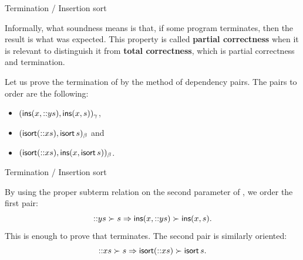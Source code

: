%
\begin{frame}{Termination / Insertion sort}

  Informally, what soundness means is that, if some program
  terminates, then the result is what was expected. This property is
  called \textbf{partial correctness} when it is relevant to
  distinguish it from \textbf{total correctness}, which is partial
  correctness and termination.

  \bigskip

  Let us prove the termination of  by the method of
  dependency pairs. The pairs to order are the following:
  \begin{itemize}

    \item \((\textsf{ins}(x, \textsf{::}{y}{s}), \textsf{ins}(x,s))_\gamma\),
    \item \((\textsf{isort}(\textsf{::}{x}{s}), \textsf{isort}\,s)_\beta\) and
    \item \((\textsf{isort}(\textsf{::}{x}{s}), \textsf{ins}(x, \textsf{isort}\,s))_\beta\).

  \end{itemize}

\end{frame}

%
\begin{frame}{Termination / Insertion sort}

  By using the proper subterm relation on the second parameter of
  , we order the first pair:
  \begin{equation*}
    \textsf{::}{y}{s} \succ s \Rightarrow \textsf{ins}(x, \textsf{::}{y}{s}) \succ
    \textsf{ins}(x,s).
  \end{equation*}
  This is enough to prove that  terminates. The second pair
  is similarly oriented:
  \begin{equation*}
    \textsf{::}{x}{s} \succ s \Rightarrow \textsf{isort}(\textsf{::}{x}{s}) \succ
    \textsf{isort}\,s.
  \end{equation*}

\end{frame}

